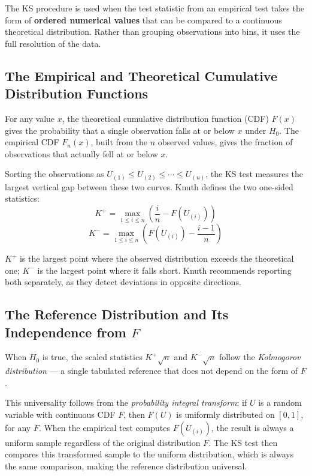 The KS procedure is used when the test statistic from an empirical test
takes the form of \textbf{ordered numerical values} that can be compared to
a continuous theoretical distribution.  Rather than grouping observations
into bins, it uses the full resolution of the data.
 
\subsection{The Empirical and Theoretical Cumulative Distribution Functions}
 
For any value $x$, the theoretical cumulative distribution function (CDF)
$F(x)$ gives the probability that a single observation falls at or below $x$
under $H_0$.  The empirical CDF $F_n(x)$, built from the $n$ observed values,
gives the fraction of observations that actually fell at or below $x$.
 
Sorting the observations as $U_{(1)} \leq U_{(2)} \leq \cdots \leq U_{(n)}$,
the KS test measures the largest vertical gap between these two curves.
Knuth defines the two one-sided statistics:
\[
  K^+ = \max_{1 \leq i \leq n} \left( \frac{i}{n} - F(U_{(i)}) \right)
\]
\[
  K^- = \max_{1 \leq i \leq n} \left( F(U_{(i)}) - \frac{i-1}{n} \right)
\]
 
$K^+$ is the largest point where the observed distribution exceeds the
theoretical one; $K^-$ is the largest point where it falls short.  Knuth
recommends reporting both separately, as they detect deviations in opposite
directions.
 
\subsection{The Reference Distribution and Its Independence from $F$}
 
When $H_0$ is true, the scaled statistics $K^+\sqrt{n}$ and $K^-\sqrt{n}$
follow the \emph{Kolmogorov distribution} --- a single tabulated reference
that does not depend on the form of $F$.
 
This universality follows from the \emph{probability integral transform}: if
$U$ is a random variable with continuous CDF $F$, then $F(U)$ is uniformly
distributed on $[0,1]$, for any $F$.  When the empirical test computes
$F(U_{(i)})$, the result is always a uniform sample regardless of the
original distribution $F$.  The KS test then compares this transformed
sample to the uniform distribution, which is always the same comparison,
making the reference distribution universal.
 
